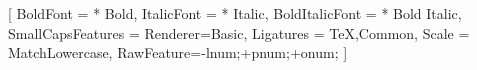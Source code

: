 \setmainfont{Libertinus Serif}
		[
			BoldFont          = {* Bold},
  			ItalicFont        = {* Italic},
  			BoldItalicFont    = {* Bold Italic},
			SmallCapsFeatures = {Renderer=Basic},
			Ligatures         = {TeX,Common},
			Scale             = MatchLowercase,
			RawFeature=-lnum;+pnum;+onum;
		]
